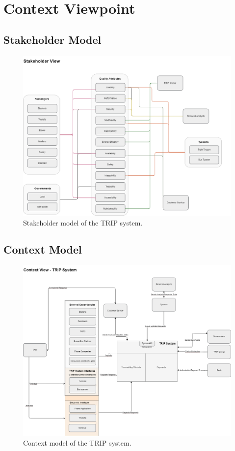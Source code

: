 \section{Context Viewpoint}

\subsection{Stakeholder Model}
\begin{figure}[H]
    \centering
    \includegraphics[width=\textwidth]{drawings/views_final_version/stakeholder_view.png}
    \caption{Stakeholder model of the TRIP system.}
    \label{fig:stakeholder_view_model}
\end{figure}

\subsection{Context Model}
\begin{figure}[H]
    \centering
    \includegraphics[width=\textwidth]{drawings/views_final_version/context_view.png}
    \caption{Context model of the TRIP system.}
    \label{fig:context_view_model}
\end{figure}

